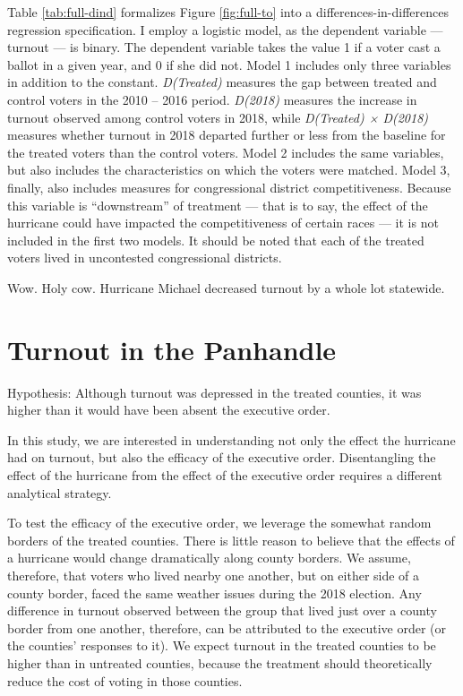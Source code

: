 \documentclass[
  12pt,
]{article}
\begin{document}
Table \ref{tab:full-dind} formalizes Figure \ref{fig:full-to} into a differences-in-differences regression specification. I employ a logistic model, as the dependent variable --- turnout --- is binary. The dependent variable takes the value 1 if a voter cast a ballot in a given year, and 0 if she did not. Model 1 includes only three variables in addition to the constant. \emph{D(Treated)} measures the gap between treated and control voters in the 2010 -- 2016 period. \emph{D(2018)} measures the increase in turnout observed among control voters in 2018, while \emph{D(Treated) × D(2018)} measures whether turnout in 2018 departed further or less from the baseline for the treated voters than the control voters. Model 2 includes the same variables, but also includes the characteristics on which the voters were matched. Model 3, finally, also includes measures for congressional district competitiveness. Because this variable is ``downstream'' of treatment --- that is to say, the effect of the hurricane could have impacted the competitiveness of certain races --- it is not included in the first two models. It should be noted that each of the treated voters lived in uncontested congressional districts.

Wow. Holy cow. Hurricane Michael decreased turnout by a whole lot statewide.

\hypertarget{turnout-in-the-panhandle}{%
\section*{Turnout in the Panhandle}\label{turnout-in-the-panhandle}}

Hypothesis: Although turnout was depressed in the treated counties, it was higher than it would have been absent the executive order.

In this study, we are interested in understanding not only the effect the hurricane had on turnout, but also the efficacy of the executive order. Disentangling the effect of the hurricane from the effect of the executive order requires a different analytical strategy.

To test the efficacy of the executive order, we leverage the somewhat random borders of the treated counties. There is little reason to believe that the effects of a hurricane would change dramatically along county borders. We assume, therefore, that voters who lived nearby one another, but on either side of a county border, faced the same weather issues during the 2018 election. Any difference in turnout observed between the group that lived just over a county border from one another, therefore, can be attributed to the executive order (or the counties' responses to it). We expect turnout in the treated counties to be higher than in untreated counties, because the treatment should theoretically reduce the cost of voting in those counties.
\end{document}
